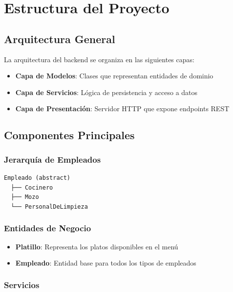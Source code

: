 \documentclass[12pt, a4paper]{report}
\begin{document}
\newpage

\chapter{Estructura del Proyecto}

\section{Arquitectura General}

La arquitectura del backend se organiza en las siguientes capas:

\begin{itemize}
    \item \textbf{Capa de Modelos}: Clases que representan entidades de dominio
    \item \textbf{Capa de Servicios}: Lógica de persistencia y acceso a datos
    \item \textbf{Capa de Presentación}: Servidor HTTP que expone endpoints REST
\end{itemize}

\section{Componentes Principales}

\subsection{Jerarquía de Empleados}

\begin{verbatim}
Empleado (abstract)
  ├── Cocinero
  ├── Mozo
  └── PersonalDeLimpieza
\end{verbatim}

\subsection{Entidades de Negocio}

\begin{itemize}
    \item \textbf{Platillo}: Representa los platos disponibles en el menú
    \item \textbf{Empleado}: Entidad base para todos los tipos de empleados
\end{itemize}

\subsection{Servicios}
\end{document}
